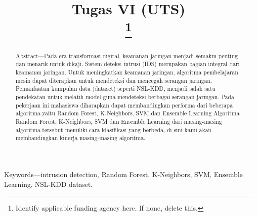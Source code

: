 \documentclass[conference]{IEEEtran}
\begin{document}
\title{Tugas VI (UTS)\\
{\footnotesize \textsuperscript{}}
\thanks{Identify applicable funding agency here. If none, delete this.}
}

\author{
\and
{}
\and
{}
}

\maketitle

\begin{abstract}
Abstract—Pada era transformasi digital, keamanan jaringan
menjadi semakin penting dan menarik untuk dikaji. Sistem
deteksi intrusi (IDS) merupakan bagian integral dari keamanan jaringan. Untuk meningkatkan keamanan jaringan, algoritma pembelajaran mesin dapat diterapkan untuk mendeteksi
dan mencegah serangan jaringan. Pemanfaatan kumpulan data
(dataset) seperti NSL-KDD, menjadi salah satu pendekatan untuk melatih model guna mendeteksi berbagai serangan jaringan.
Pada pekerjaan ini mahasiswa diharapkan dapat membandingkan performa dari beberapa algoritma yaitu Random Forest,
K-Neighbors, SVM dan Ensemble Learning
Algoritma Random Forest, K-Neighbors, SVM dan Ensemble
Learning dari masing-masing algoritma tersebut memiliki cara
klasifikasi yang berbeda, di sini kami akan membandingkan
kinerja masing-masing algoritma.

\end{abstract}

\begin{IEEEkeywords}
Keywords—intrusion detection, Random Forest, K-Neighbors,
SVM, Ensemble Learning, NSL-KDD dataset.
\end{IEEEkeywords}
\end{document}
